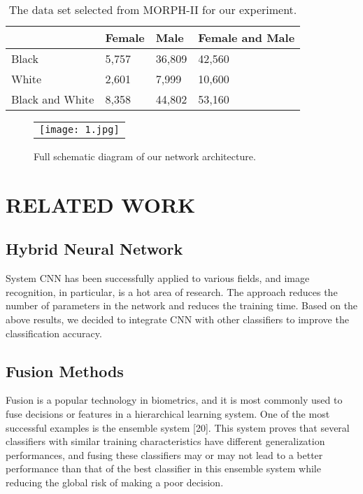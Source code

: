 \documentclass[12pt]{spieman}  %
\begin{document}
\begin{spacing}{2}
\begin{table}[ht]
\caption{The data set selected from MORPH-II for our experiment.} 
\label{tab:fonts}
\begin{center}       
\begin{tabular}{|l|l|l|l|} %
\hline
\rule[-1ex]{0pt}{3.5ex}   & Female & Male & Female and Male\\
\hline\hline
\rule[-1ex]{0pt}{3.5ex} Black & 5,757 & 36,809 & 42,560  \\
\hline
\rule[-1ex]{0pt}{3.5ex}  White & 2,601 & 7,999 & 10,600   \\
\hline
\rule[-1ex]{0pt}{3.5ex} Black and White & 8,358 & 44,802 & 53,160  \\
\hline
\end{tabular}
\end{center}
\end{table} 

\begin{figure}
\begin{center}
\begin{tabular}{c}
\texttt{[image: 1.jpg]}
\end{tabular}
\end{center}
\caption 
{ \label{fig:example1}
Full schematic diagram of our network architecture. } 
\end{figure} 


\section{RELATED WORK}

\subsection{Hybrid Neural Network }
\label{sect:title}
System CNN has been successfully applied to various fields, and image recognition, in particular, is a hot area of research. The approach reduces the number of parameters in the network and reduces the training time. Based on the above results, we decided to integrate CNN with other classifiers to improve the classification accuracy. 

\subsection{Fusion Methods}
Fusion is a popular technology in biometrics, and it is most commonly used to fuse decisions or features in a hierarchical learning system. One of the most successful examples is the ensemble system [20]. This system proves that several classifiers with similar training characteristics have different generalization performances, and fusing these classifiers may or may not lead to a better performance than that of the best classifier in this ensemble system while reducing the global risk of making a poor decision. 


\end{spacing}
\end{document}
